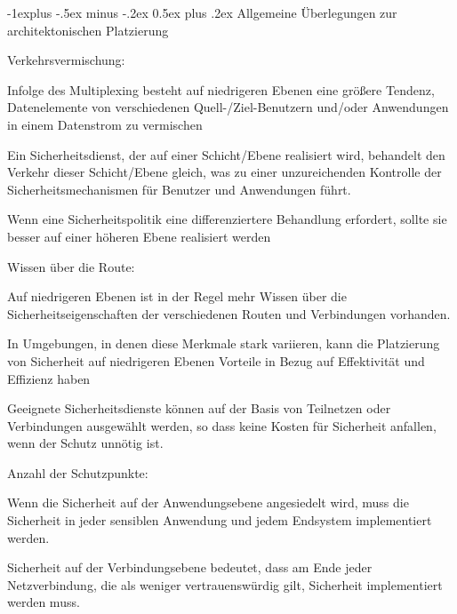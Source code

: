 \documentclass[a4paper]{article}
\makeatletter
\renewcommand{\subsection}{\@startsection{subsection}{2}{0mm}%
 {-1explus -.5ex minus -.2ex}%
 {0.5ex plus .2ex}%
 {\normalfont\normalsize\bfseries}}
\makeatother
\begin{document}
\begin{multicols}{3}
      \subsection{Allgemeine Überlegungen zur architektonischen Platzierung}
      \begin{itemize*}
            \item Verkehrsvermischung:
            \begin{itemize*}
                  \item Infolge des Multiplexing besteht auf niedrigeren Ebenen eine größere Tendenz, Datenelemente von verschiedenen Quell-/Ziel-Benutzern und/oder Anwendungen in einem Datenstrom zu vermischen
                  \item Ein Sicherheitsdienst, der auf einer Schicht/Ebene realisiert wird, behandelt den Verkehr dieser Schicht/Ebene gleich, was zu einer unzureichenden Kontrolle der Sicherheitsmechanismen für Benutzer und Anwendungen führt.
                  \item Wenn eine Sicherheitspolitik eine differenziertere Behandlung erfordert, sollte sie besser auf einer höheren Ebene realisiert werden
            \end{itemize*}
            \item Wissen über die Route:
            \begin{itemize*}
                  \item Auf niedrigeren Ebenen ist in der Regel mehr Wissen über die Sicherheitseigenschaften der verschiedenen Routen und Verbindungen vorhanden.
                  \item In Umgebungen, in denen diese Merkmale stark variieren, kann die Platzierung von Sicherheit auf niedrigeren Ebenen Vorteile in Bezug auf Effektivität und Effizienz haben
                  \item Geeignete Sicherheitsdienste können auf der Basis von Teilnetzen oder Verbindungen ausgewählt werden, so dass keine Kosten für Sicherheit anfallen, wenn der Schutz unnötig ist.
            \end{itemize*}
            \item Anzahl der Schutzpunkte:
            \begin{itemize*}
                  \item Wenn die Sicherheit auf der Anwendungsebene angesiedelt wird, muss die Sicherheit in jeder sensiblen Anwendung und jedem Endsystem implementiert werden.
                  \item Sicherheit auf der Verbindungsebene bedeutet, dass am Ende jeder Netzverbindung, die als weniger vertrauenswürdig gilt, Sicherheit implementiert werden muss.

\end{itemize*}
\end{itemize*}
\end{multicols}
\end{document}
